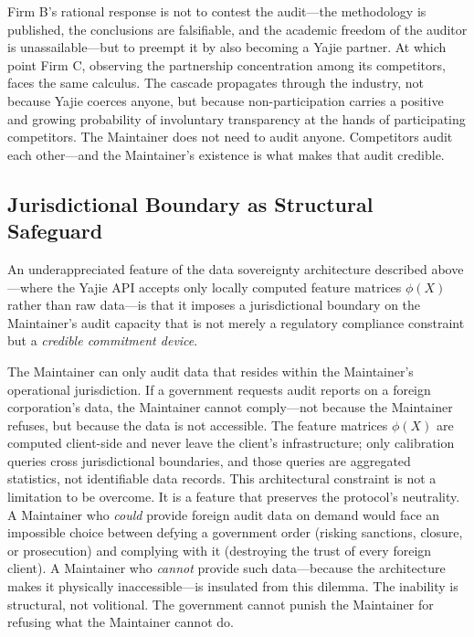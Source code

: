 \documentclass[12pt,a4paper]{ctexart}
\theoremstyle{definition}
\theoremstyle{remark}
\begin{document}
Firm B's rational response is not to contest the audit—the methodology is published, the conclusions are falsifiable, and the academic freedom of the auditor is unassailable—but to preempt it by also becoming a Yajie partner. At which point Firm C, observing the partnership concentration among its competitors, faces the same calculus. The cascade propagates through the industry, not because Yajie coerces anyone, but because non-participation carries a positive and growing probability of involuntary transparency at the hands of participating competitors. The Maintainer does not need to audit anyone. Competitors audit each other—and the Maintainer's existence is what makes that audit credible.

\subsection{Jurisdictional Boundary as Structural Safeguard}

An underappreciated feature of the data sovereignty architecture described above—where the Yajie API accepts only locally computed feature matrices $\phi(X)$ rather than raw data—is that it imposes a jurisdictional boundary on the Maintainer's audit capacity that is not merely a regulatory compliance constraint but a \textit{credible commitment device}.

The Maintainer can only audit data that resides within the Maintainer's operational jurisdiction. If a government requests audit reports on a foreign corporation's data, the Maintainer cannot comply—not because the Maintainer refuses, but because the data is not accessible. The feature matrices $\phi(X)$ are computed client-side and never leave the client's infrastructure; only calibration queries cross jurisdictional boundaries, and those queries are aggregated statistics, not identifiable data records. This architectural constraint is not a limitation to be overcome. It is a feature that preserves the protocol's neutrality. A Maintainer who \textit{could} provide foreign audit data on demand would face an impossible choice between defying a government order (risking sanctions, closure, or prosecution) and complying with it (destroying the trust of every foreign client). A Maintainer who \textit{cannot} provide such data—because the architecture makes it physically inaccessible—is insulated from this dilemma. The inability is structural, not volitional. The government cannot punish the Maintainer for refusing what the Maintainer cannot do.
\end{document}
